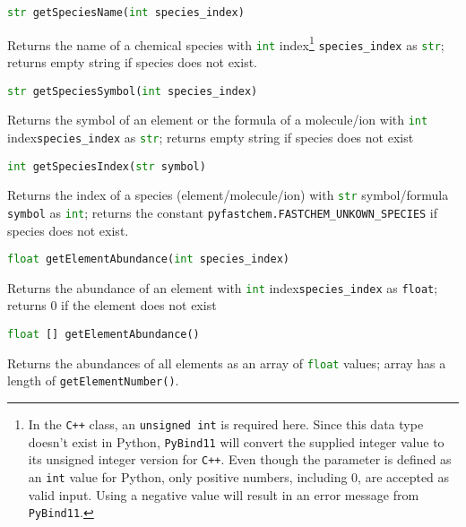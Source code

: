 \documentclass[numbers=noenddot]{aux/fcmanual}
\newcommand{\cpp}{\ttt{C++}\xspace}
\newcommand{\pb}{\texttt{PyBind11}\xspace}
\newcommand{\ttt}[1]{\texttt {#1}}
\begin{document}
\bigbreak

\lstinline[language=Python]!str getSpeciesName(int species_index)!
\begin{addmargin}[25pt]{0pt}
	Returns the name of a chemical species with \lstinline[language=Python]!int! index\footnote{In the \cpp class, an \lstinline!unsigned int! is required here. Since this data type doesn't exist in Python, \pb will convert the supplied integer value to its unsigned integer version for \cpp. Even though the parameter is defined as an \lstinline!int! value for Python, only positive numbers, including 0, are accepted as valid input. Using a negative value will result in an error message from \pb.} \lstinline!species_index! as \lstinline[language=Python]!str!; returns empty string if species does not exist.
\end{addmargin}  

\bigbreak

\lstinline[language=Python]!str getSpeciesSymbol(int species_index)!
\begin{addmargin}[25pt]{0pt}
	Returns the symbol of an element or the formula of a molecule/ion with \lstinline[language=Python]!int! index\footnotemark[\value{footnote}] \lstinline!species_index! as \lstinline[language=Python]!str!; returns empty string if species does not exist
\end{addmargin}

\bigbreak

\lstinline[language=Python]!int getSpeciesIndex(str symbol)!
\begin{addmargin}[25pt]{0pt}
	Returns the index of a species (element/molecule/ion) with \lstinline[language=Python]!str! symbol/formula \lstinline!symbol! as \lstinline[language=Python]!int!; returns the constant \lstinline!pyfastchem.FASTCHEM_UNKOWN_SPECIES! if species does not exist.
\end{addmargin}

\bigbreak

\lstinline[language=Python]!float getElementAbundance(int species_index)!
\begin{addmargin}[25pt]{0pt}
	Returns the abundance of an element with \lstinline[language=Python]!int! index\footnotemark[\value{footnote}] \lstinline!species_index! as \lstinline!float!; returns 0 if the element does not exist
\end{addmargin}


\bigbreak

\lstinline[language=Python]!float [] getElementAbundance()!
\begin{addmargin}[25pt]{0pt}
	Returns the abundances of all elements as an array of \lstinline[language=Python]!float! values; array has a length of \lstinline!getElementNumber()!.
\end{addmargin}
\end{document}
